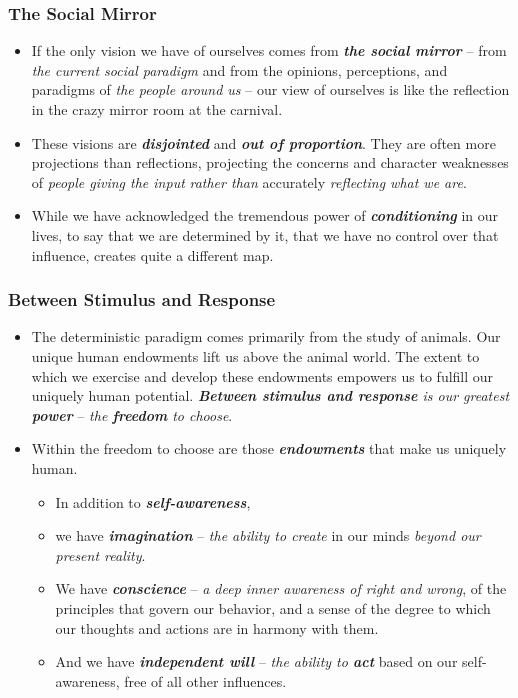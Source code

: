 \documentclass[11pt]{article}
\begin{document}
\subsubsection{The Social Mirror}
\begin{itemize}
\item If the only vision we have of ourselves comes from \emph{\textbf{the social mirror}} -- from \emph{the current social paradigm} and from the opinions, perceptions, and paradigms of \emph{the people around us} -- our view of ourselves is like the reflection in the crazy mirror room at the carnival.

\item These visions are \emph{\textbf{disjointed}} and \emph{\textbf{out of proportion}}. They are often more projections than reflections, projecting the concerns and character weaknesses of \emph{people giving the input} \emph{rather than} accurately \emph{reflecting what we are}.

\item While we have acknowledged the tremendous power of \emph{\textbf{conditioning}} in our lives, to say that we are determined by it, that we have no control over that influence, creates quite a different map.
\end{itemize}
\subsubsection{Between Stimulus and Response}
\begin{itemize}
\item The deterministic paradigm comes primarily from the study of animals. Our unique human endowments lift us above the animal world. The extent to which we exercise and develop these endowments empowers us to fulfill our uniquely human potential. \emph{\textbf{Between stimulus and response} is our greatest \textbf{power}} -- \emph{the \textbf{freedom} to choose}.

\item Within the freedom to choose are those \emph{\textbf{endowments}} that make us uniquely human. 
\begin{itemize}
\item In addition to \emph{\textbf{self-awareness}},
\item we have \emph{\textbf{imagination}} -- \emph{the ability to create} in our minds \emph{beyond our present reality}.
\item We have \emph{\textbf{conscience}} -- \emph{a deep inner awareness of right and wrong}, of the principles that govern our behavior, and a sense of the degree to which our thoughts and actions are in harmony with them.
\item And we have \emph{\textbf{independent will}} -- \emph{the ability to \textbf{act}} based on our self-awareness, free of all other influences.
\end{itemize}


 
\end{itemize}
\end{document}
